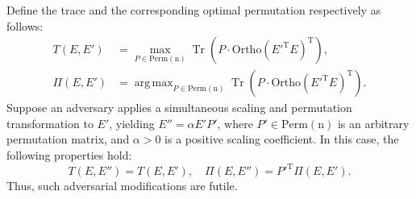 \documentclass[10pt,a4paper]{amsart}
\DeclareMathOperator*{\argmax}{arg\,max}
\DeclareMathOperator{\Tr}{Tr}
\begin{document}
\begin{thm}
Define the trace and the corresponding optimal permutation respectively as follows:
\[
\begin{aligned}
    T(E, E') &= \max_{P \in \mathrm{Perm}(\mathrm{n})} \Tr\left(P \cdot \mathrm{Ortho}\left(E'^{\text{T}} E\right)^{\text{T}}\right), \\
    \Pi(E, E') &= \argmax_{P \in \mathrm{Perm}(\mathrm{n})} \Tr\left(P \cdot \mathrm{Ortho}\left(E'^{\text{T}} E\right)^{\text{T}}\right).
\end{aligned}
\]
Suppose an adversary applies a simultaneous scaling and permutation transformation to $E'$, yielding $E'' = \alpha E' P'$, where $P' \in \mathrm{Perm}(\mathrm{n})$ is an arbitrary permutation matrix, and $\alpha > 0$ is a positive scaling coefficient. In this case, the following properties hold:
\[
T(E, E'') = T(E, E'), \quad \Pi(E, E'') = P'^{\text{T}} \Pi(E, E').
\]
Thus, such adversarial modifications are futile.
\end{thm}
\end{document}
